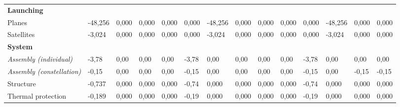\begin{landscape}
\begin{table}[]
{\begin{tabular}{|l|l|l|l|l|l|l|l|l|l|l|l|l|l|}
\textbf{Launching}                                                                     &                  &                 &                 &                 &                 &                 &                 &                 &                 &                 &                  &                  &                  \\
Planes                                                                                 & -48,256          & 0,000           & 0,000           & 0,000           & 0,000           & -48,256         & 0,000           & 0,000           & 0,000           & 0,000           & -48,256          & 0,000            & 0,000            \\
Satellites                                                                             & -3,024           & 0,000           & 0,000           & 0,000           & 0,000           & -3,024          & 0,000           & 0,000           & 0,000           & 0,000           & -3,024           & 0,000            & 0,000            \\
\textbf{System}                                                                        &                  &                 &                 &                 &                 &                 &                 &                 &                 &                 &                  &                  &                  \\
\textit{Assembly (individual)}                                                         & -3,78            & 0,00            & 0,00            & 0,00            & -3,78           & 0,00            & 0,00            & 0,00            & 0,00            & -3,78           & 0,00             & 0,00             & 0,00             \\
\textit{Assembly (constellation)}                                                      & -0,15            & 0,00            & 0,00            & 0,00            & -0,15           & 0,00            & 0,00            & 0,00            & 0,00            & -0,15           & 0,00             & -0,15            & -0,15            \\
Structure                                                                              & -0,737           & 0,000           & 0,000           & 0,000           & -0,74           & 0,000           & 0,000           & 0,000           & 0,000           & -0,74           & 0,000            & 0,000            & 0,000            \\
Thermal protection                                                                     & -0,189           & 0,000           & 0,000           & 0,000           & -0,19           & 0,000           & 0,000           & 0,000           & 0,000           & -0,19           & 0,000            & 0,000            & 0,000            \\

\end{tabular}}
\end{table}
\end{landscape}
